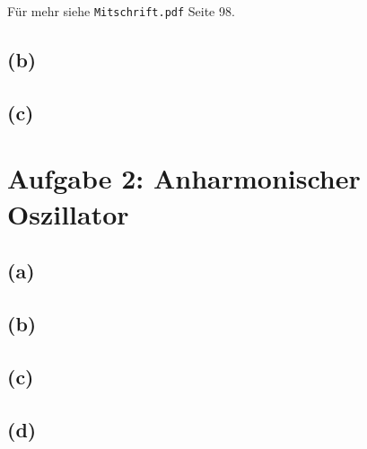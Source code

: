 \documentclass{scrartcl}
\begin{document}
Für mehr siehe \texttt{Mitschrift.pdf} Seite 98.

\subsection*{(b)}
\subsection*{(c)}
\section*{Aufgabe 2: Anharmonischer Oszillator}
\subsection*{(a)}
\subsection*{(b)}
\subsection*{(c)}
\subsection*{(d)}
\end{document}
